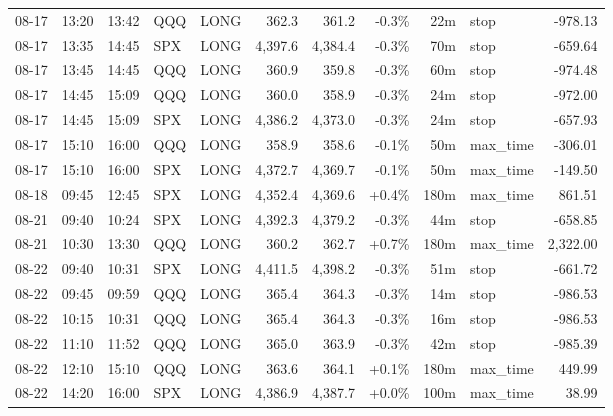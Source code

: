 \documentclass[11pt,a4paper,twoside]{article}
\begin{document}
\begin{center}
\begin{longtable}{>{\color{txtmain}}l l l l l r r r r >{\color{txtmain}}l r}
08-17 & 13:20 & 13:42 & QQQ & LONG & 362.3 & 361.2 & \textcolor{lossred}{-0.3\%} & 22m & stop & \textcolor{lossred}{-978.13} \\
08-17 & 13:35 & 14:45 & SPX & LONG & 4,397.6 & 4,384.4 & \textcolor{lossred}{-0.3\%} & 70m & stop & \textcolor{lossred}{-659.64} \\
08-17 & 13:45 & 14:45 & QQQ & LONG & 360.9 & 359.8 & \textcolor{lossred}{-0.3\%} & 60m & stop & \textcolor{lossred}{-974.48} \\
08-17 & 14:45 & 15:09 & QQQ & LONG & 360.0 & 358.9 & \textcolor{lossred}{-0.3\%} & 24m & stop & \textcolor{lossred}{-972.00} \\
08-17 & 14:45 & 15:09 & SPX & LONG & 4,386.2 & 4,373.0 & \textcolor{lossred}{-0.3\%} & 24m & stop & \textcolor{lossred}{-657.93} \\
08-17 & 15:10 & 16:00 & QQQ & LONG & 358.9 & 358.6 & \textcolor{lossred}{-0.1\%} & 50m & max\_time & \textcolor{lossred}{-306.01} \\
08-17 & 15:10 & 16:00 & SPX & LONG & 4,372.7 & 4,369.7 & \textcolor{lossred}{-0.1\%} & 50m & max\_time & \textcolor{lossred}{-149.50} \\
08-18 & 09:45 & 12:45 & SPX & LONG & 4,352.4 & 4,369.6 & \textcolor{wingreen}{+0.4\%} & 180m & max\_time & \textcolor{wingreen}{861.51} \\
08-21 & 09:40 & 10:24 & SPX & LONG & 4,392.3 & 4,379.2 & \textcolor{lossred}{-0.3\%} & 44m & stop & \textcolor{lossred}{-658.85} \\
08-21 & 10:30 & 13:30 & QQQ & LONG & 360.2 & 362.7 & \textcolor{wingreen}{+0.7\%} & 180m & max\_time & \textcolor{wingreen}{2,322.00} \\
08-22 & 09:40 & 10:31 & SPX & LONG & 4,411.5 & 4,398.2 & \textcolor{lossred}{-0.3\%} & 51m & stop & \textcolor{lossred}{-661.72} \\
08-22 & 09:45 & 09:59 & QQQ & LONG & 365.4 & 364.3 & \textcolor{lossred}{-0.3\%} & 14m & stop & \textcolor{lossred}{-986.53} \\
08-22 & 10:15 & 10:31 & QQQ & LONG & 365.4 & 364.3 & \textcolor{lossred}{-0.3\%} & 16m & stop & \textcolor{lossred}{-986.53} \\
08-22 & 11:10 & 11:52 & QQQ & LONG & 365.0 & 363.9 & \textcolor{lossred}{-0.3\%} & 42m & stop & \textcolor{lossred}{-985.39} \\
08-22 & 12:10 & 15:10 & QQQ & LONG & 363.6 & 364.1 & \textcolor{wingreen}{+0.1\%} & 180m & max\_time & \textcolor{wingreen}{449.99} \\
08-22 & 14:20 & 16:00 & SPX & LONG & 4,386.9 & 4,387.7 & \textcolor{wingreen}{+0.0\%} & 100m & max\_time & \textcolor{wingreen}{38.99} \\

\end{longtable}
\end{center}
\end{document}
